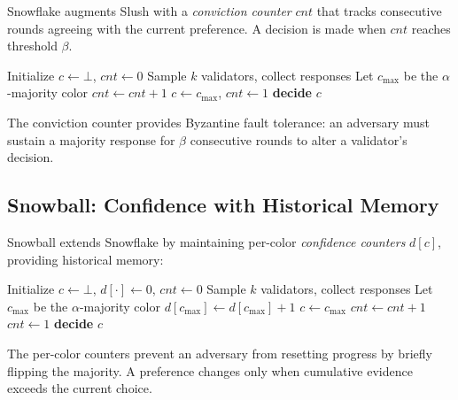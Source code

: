Snowflake augments Slush with a \emph{conviction counter} $\mathit{cnt}$ that tracks consecutive rounds agreeing with the current preference. A decision is made when $\mathit{cnt}$ reaches threshold $\beta$.

\begin{algorithm}[h]
\caption{Snowflake Protocol}
\begin{algorithmic}[1]
\State Initialize $c \gets \bot$, $\mathit{cnt} \gets 0$
    \State Sample $k$ validators, collect responses
    \State Let $c_{\max}$ be the $\alpha$-majority color
        \State $\mathit{cnt} \gets \mathit{cnt} + 1$
    \Else
        \State $c \gets c_{\max}$, $\mathit{cnt} \gets 1$
    \EndIf
     \textbf{decide} $c$ \EndIf
\EndUpon
\end{algorithmic}
\end{algorithm}

The conviction counter provides Byzantine fault tolerance: an adversary must sustain a majority response for $\beta$ consecutive rounds to alter a validator's decision.

\subsection{Snowball: Confidence with Historical Memory}

Snowball extends Snowflake by maintaining per-color \emph{confidence counters} $d[c]$, providing historical memory:

\begin{algorithm}[h]
\caption{Snowball Protocol}
\begin{algorithmic}[1]
\State Initialize $c \gets \bot$, $d[\cdot] \gets 0$, $\mathit{cnt} \gets 0$
    \State Sample $k$ validators, collect responses
    \State Let $c_{\max}$ be the $\alpha$-majority color
    \State $d[c_{\max}] \gets d[c_{\max}] + 1$
     $c \gets c_{\max}$ \EndIf
     $\mathit{cnt} \gets \mathit{cnt} + 1$ \Else{} $\mathit{cnt} \gets 1$ \EndIf
     \textbf{decide} $c$ \EndIf
\EndUpon
\end{algorithmic}
\end{algorithm}

The per-color counters prevent an adversary from resetting progress by briefly flipping the majority. A preference changes only when cumulative evidence exceeds the current choice.

